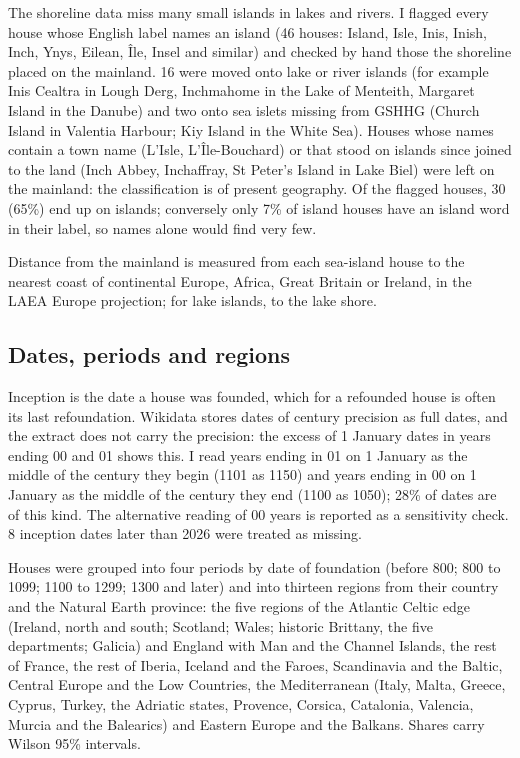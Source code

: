 \documentclass[11pt,a4paper]{article}
\begin{document}
The shoreline data miss many small islands in lakes and rivers. I flagged every house whose English label names an island (46 houses: Island, Isle, Inis, Inish, Inch, Ynys, Eilean, Île, Insel and similar) and checked by hand those the shoreline placed on the mainland. 16 were moved onto lake or river islands (for example Inis Cealtra in Lough Derg, Inchmahome in the Lake of Menteith, Margaret Island in the Danube) and two onto sea islets missing from GSHHG (Church Island in Valentia Harbour; Kiy Island in the White Sea). Houses whose names contain a town name (L'Isle, L'Île-Bouchard) or that stood on islands since joined to the land (Inch Abbey, Inchaffray, St Peter's Island in Lake Biel) were left on the mainland: the classification is of present geography. Of the flagged houses, 30 (65\%) end up on islands; conversely only 7\% of island houses have an island word in their label, so names alone would find very few.

Distance from the mainland is measured from each sea-island house to the nearest coast of continental Europe, Africa, Great Britain or Ireland, in the LAEA Europe projection; for lake islands, to the lake shore.

\subsection{Dates, periods and regions}
Inception is the date a house was founded, which for a refounded house is often its last refoundation. Wikidata stores dates of century precision as full dates, and the extract does not carry the precision: the excess of 1 January dates in years ending 00 and 01 shows this. I read years ending in 01 on 1 January as the middle of the century they begin (1101 as 1150) and years ending in 00 on 1 January as the middle of the century they end (1100 as 1050); 28\% of dates are of this kind. The alternative reading of 00 years is reported as a sensitivity check. 8 inception dates later than 2026 were treated as missing.

Houses were grouped into four periods by date of foundation (before 800; 800 to 1099; 1100 to 1299; 1300 and later) and into thirteen regions from their country and the Natural Earth province: the five regions of the Atlantic Celtic edge (Ireland, north and south; Scotland; Wales; historic Brittany, the five departments; Galicia) and England with Man and the Channel Islands, the rest of France, the rest of Iberia, Iceland and the Faroes, Scandinavia and the Baltic, Central Europe and the Low Countries, the Mediterranean (Italy, Malta, Greece, Cyprus, Turkey, the Adriatic states, Provence, Corsica, Catalonia, Valencia, Murcia and the Balearics) and Eastern Europe and the Balkans. Shares carry Wilson 95\% intervals.
\end{document}
